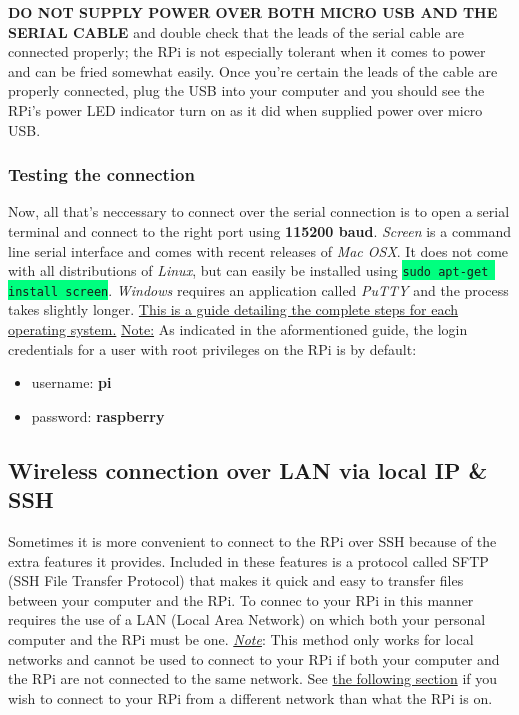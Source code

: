 \documentclass{article}
\newcommand{\codei}[1]{\colorbox{SpringGreen}{\texttt{#1}}} %
\begin{document}
    \textbf{DO NOT SUPPLY POWER OVER BOTH MICRO USB AND THE SERIAL CABLE} and double check that the leads of the serial cable are connected properly; the RPi is not especially tolerant when it comes to power and can be fried somewhat easily. Once you're certain the leads of the cable are properly connected, plug the USB into your computer and you should see the RPi's power LED indicator turn on as it did when supplied power over micro USB.

    \subsubsection{Testing the connection}
    Now, all that's neccessary to connect over the serial connection is to open a serial terminal and connect to the right port using \textbf{115200 baud}. \textit{Screen} is a command line serial interface and comes with recent releases of \textit{Mac OSX}. It does not come with all distributions of \textit{Linux}, but can easily be installed using \codei{sudo apt-get install screen}. \textit{Windows} requires an application called \textit{PuTTY} and the process takes slightly longer. \href{https://learn.adafruit.com/adafruits-raspberry-pi-lesson-5-using-a-console-cable/test-and-configure}{This is a guide detailing the complete steps for each operating system.}
    \newline\newline
    \underline{Note:} As indicated in the aformentioned guide, the login credentials for a user with root privileges on the RPi is by default:
    \begin{itemize}
      \item username: \textbf{pi}
      \item password: \textbf{raspberry}
    \end{itemize}
    \subsection{Wireless connection over LAN via local IP \& SSH}
    \label{sec:connect-ssh}
    Sometimes it is more convenient to connect to the RPi over SSH because of the extra features it provides. Included in these features is a protocol called SFTP (SSH File Transfer Protocol) that makes it quick and easy to transfer files between your computer and the RPi. To connec to your RPi in this manner requires the use of a LAN (Local Area Network) on which both your personal computer and the RPi must be one.
    \newline
    \newline
    \underline{\textit{Note}}: This method only works for local networks and cannot be used to connect to your RPi if both your computer and the RPi are not connected to the same network. See \hyperref[sec:connect-sshwan]{the following section} if you wish to connect to your RPi from a different network than what the RPi is on.
\end{document}
